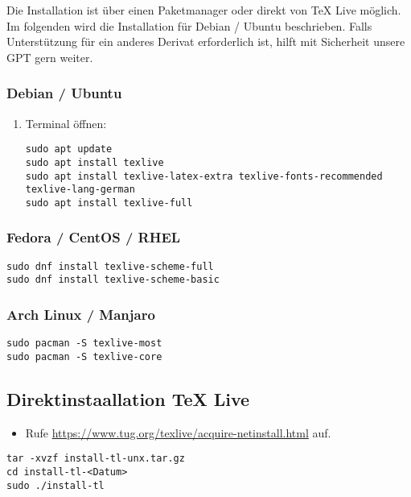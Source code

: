 Die Installation ist über einen Paketmanager oder direkt von TeX Live möglich. 
Im folgenden wird die Installation für Debian / Ubuntu beschrieben. 
Falls Unterstützung für ein anderes Derivat erforderlich ist, hilft mit Sicherheit unsere GPT gern weiter. %

\subsubsection{Debian / Ubuntu}
\begin{enumerate}
    \item Terminal öffnen:
    \begin{verbatim}
sudo apt update
sudo apt install texlive
sudo apt install texlive-latex-extra texlive-fonts-recommended texlive-lang-german
sudo apt install texlive-full
    \end{verbatim}
\end{enumerate}

\subsubsection{Fedora / CentOS / RHEL}
\begin{verbatim}
sudo dnf install texlive-scheme-full
sudo dnf install texlive-scheme-basic
\end{verbatim}

\subsubsection{Arch Linux / Manjaro}
\begin{verbatim}
sudo pacman -S texlive-most
sudo pacman -S texlive-core
\end{verbatim}

\subsection{Direktinstaallation TeX Live}
\begin{itemize}
    \item Rufe \mbox{\url{https://www.tug.org/texlive/acquire-netinstall.html}} auf.
\end{itemize}
\begin{verbatim}
tar -xvzf install-tl-unx.tar.gz
cd install-tl-<Datum>
sudo ./install-tl
\end{verbatim}

